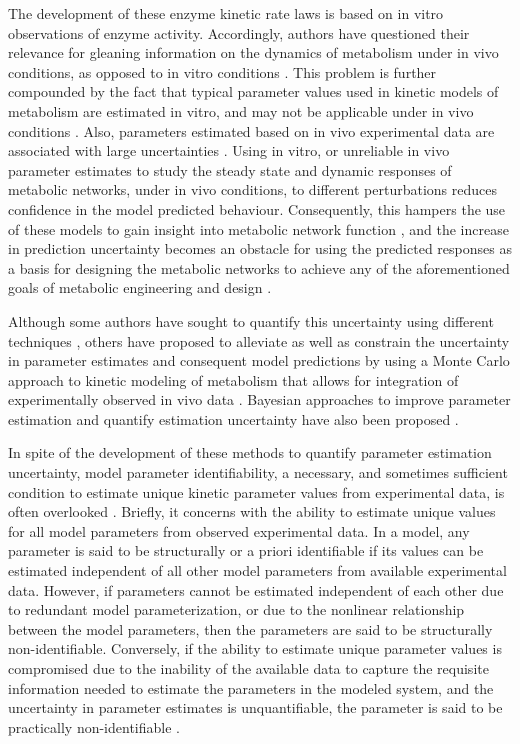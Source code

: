 \documentclass[10pt]{article}
\begin{document}
	The development of these enzyme kinetic rate laws is based on in vitro observations of enzyme activity. Accordingly, authors have questioned their relevance for gleaning information on the dynamics of metabolism under in vivo conditions, as opposed to in vitro conditions \parencite{Heijnen2005,Heijnen2013}. This problem is further compounded by the fact that typical parameter values used in kinetic models of metabolism are estimated in vitro, and may not be applicable under in vivo conditions \parencite{Heijnen2005,Smallbone2007}. Also, parameters estimated based on in vivo experimental data are associated with large uncertainties \parencite{Link2014}. Using in vitro, or unreliable in vivo parameter estimates to study the steady state and dynamic responses of metabolic networks, under in vivo conditions, to different perturbations reduces confidence in the model predicted behaviour. Consequently, this hampers the use of these models to gain insight into metabolic network function \parencite{Andreozzi2016a,Vasilakou2016}, and the increase in prediction uncertainty becomes an obstacle for using the predicted responses as a basis for designing the metabolic networks to achieve any of the aforementioned goals of metabolic engineering and design \parencite{Saa2017}.  
	
	Although some authors have sought to quantify this uncertainty using different techniques \parencite{Vanlier2013,Andreozzi2016a}, others have proposed to alleviate as well as constrain the uncertainty in parameter estimates and consequent model predictions by using a Monte Carlo approach to kinetic modeling of metabolism that allows for integration of experimentally observed in vivo data \parencite{Srinivasan2015}. Bayesian approaches to improve parameter estimation and quantify estimation uncertainty have also been proposed \parencite{Saa2016}.
	
	In spite of the development of these methods to quantify parameter estimation uncertainty, model parameter identifiability, a necessary, and sometimes sufficient condition to estimate unique kinetic parameter values from experimental data, is often overlooked \parencite{Ljung1994,Berthoumieux2013}. Briefly, it concerns with the ability to estimate unique values for all model parameters from observed experimental data. In a model, any parameter is said to be structurally or a priori identifiable if its values can be estimated independent of all other model parameters from available experimental data. However, if parameters cannot be estimated independent of each other due to redundant model parameterization, or due to the nonlinear relationship between the model parameters, then the parameters are said to be structurally non-identifiable. Conversely, if the ability to estimate unique parameter values is compromised due to the inability of the available data to capture the requisite information needed to estimate the parameters in the modeled system, and the uncertainty in parameter estimates is unquantifiable, the parameter is said to be practically non-identifiable \parencite{Ljung1994}. 
	
\end{document}

